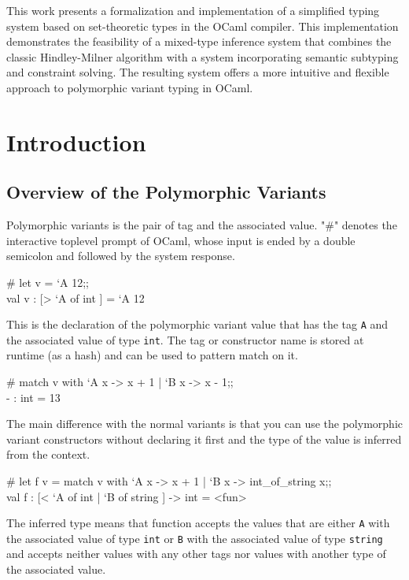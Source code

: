 \documentclass[a4paper,11pt,oneside]{article}
\theoremstyle{definition}
\begin{document}

This work presents a formalization and implementation of a simplified typing system based on set-theoretic types in the OCaml compiler.
This implementation demonstrates the feasibility of a mixed-type inference system that combines the classic Hindley-Milner algorithm with a system incorporating semantic subtyping and constraint solving.
The resulting system offers a more intuitive and flexible approach to polymorphic variant typing in OCaml.

\newpage
\tableofcontents

\clearpage
{}

\section{Introduction}

\subsection{Overview of the Polymorphic Variants}

Polymorphic variants is the pair of tag and the associated value. "\#"
denotes the interactive toplevel prompt of OCaml, whose input is
ended by a double semicolon and followed by the system response.

{\ttfamily
\# let v = `A 12;; \\
val v : [> `A of int ] = `A 12
}

This is the declaration of the polymorphic variant value that has the tag \texttt{A} and the associated value of type \texttt{int}.
The tag or constructor name is stored at runtime (as a hash) and can be used to pattern match on it.

  {\ttfamily
    \# match v with `A x -> x + 1 | `B x -> x - 1;; \\
    - : int = 13
  }

The main difference with the normal variants is that you can use the polymorphic variant constructors without declaring it first and the type of the value is inferred from the context.

{\ttfamily
\# let f v = match v with `A x -> x + 1 | `B x -> int\_of\_string x;; \\
val f : [< `A of int | `B of string ] -> int = <fun>
}

The inferred type means that function accepts the values that are either \texttt{A} with the associated value of type \texttt{int} or \texttt{B} with the associated value of type \texttt{string} and accepts neither values with any other tags nor values with another type of the associated value.
\end{document}
